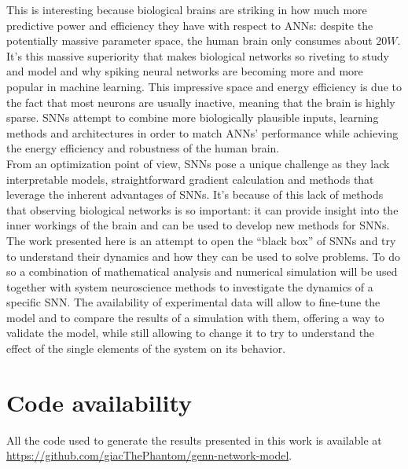   This is interesting because biological brains are striking in how much more predictive power and efficiency they have with respect to ANNs: despite the potentially massive parameter space, the human brain only consumes about $20W$.\\
  It's this massive superiority that makes biological networks so riveting to study and model and why spiking neural networks are becoming more and more popular in machine learning.
  This impressive space and energy efficiency is due to the fact that most neurons are usually inactive, meaning that the brain is highly sparse.
  SNNs attempt to combine more biologically plausible inputs, learning methods and architectures in order to match ANNs' performance while achieving the energy efficiency and robustness of the human brain.\\
  From an optimization point of view, SNNs pose a unique challenge as they lack interpretable models, straightforward gradient calculation and methods that leverage the inherent advantages of SNNs.
  It's because of this lack of methods that observing biological networks is so important: it can provide insight into the inner workings of the brain and can be used to develop new methods for SNNs.\\
  The work presented here is an attempt to open the ``black box'' of SNNs and try to understand their dynamics and how they can be used to solve problems.
  To do so a combination of mathematical analysis and numerical simulation will be used together with system neuroscience methods to investigate the dynamics of a specific SNN.
  The availability of experimental data will allow to fine-tune the model and to compare the results of a simulation with them, offering a way to validate the model, while still allowing to change it to try to understand the effect of the single elements of the system on its behavior.

\section{Code availability}
All the code used to generate the results presented in this work is available at \href{https://github.com/giacThePhantom/genn-network-model}{https://github.com/giacThePhantom/genn-network-model}.
